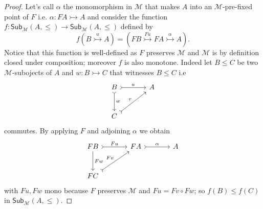 \documentclass[letterpaper, 11pt, oneside]{memoir}
\theoremstyle{myteo}
\numberwithin{equation}{section}
\newcommand{\Sub}{\textsf{Sub}}
\begin{document}
\begin{proof}
  Let's call \(\alpha\) the monomorphism in \(\mathcal{M}\) that makes \(A\) into an \(\mathcal{M}\)-pre-fixed point of \(F\) i.e. \(\alpha : FA \rightarrowtail A\) and consider the function \(f : \Sub_{\mathcal{M}}(A, \leq) \to \Sub_{\mathcal{M}}(A, \leq)\) defined by
  \begin{equation*}
    f(B \overset{u}{\rightarrowtail} A) = (FB \overset{Fu}{\rightarrowtail} FA \overset{\alpha}{\rightarrowtail} A).
  \end{equation*}
  Notice that this function is well-defined as \(F\) preserves \(\mathcal{M}\) and \(\mathcal{M}\) is by definition closed under composition; moreover \(f\) is also monotone.
  Indeed let \(B \leq C\) be two \(\mathcal{M}\)-subojects of \(A\) and \(w : B \rightarrowtail C\) that witnesses \(B \leq C\) i.e
  \begin{equation*}
    \begin{tikzcd}[sep=large]
      B \ar[r, tail, "u"] \ar[d, tail, "w"] & A \\
      C \ar[ru, tail, "v"]&
    \end{tikzcd}
  \end{equation*}
  commutes.
  By applying \(F\) and adjoining \(\alpha\) we obtain
  \begin{equation*}
    \begin{tikzcd}[sep=large]
      FB \ar[r, tail, "Fu"] \ar[d, "Fw"] & FA \ar[r, tail, "\alpha"] & A \\
      FC \ar[ru, tail, "Fv"]
    \end{tikzcd}
  \end{equation*}
  with \(Fu, Fw\) mono because \(F\) preserves \(\mathcal{M}\) and \(Fu = Fv \circ Fw\); so \(f(B) \leq f(C)\) in \(\Sub_\mathcal{M}(A, \leq)\).


\end{proof}
\end{document}
